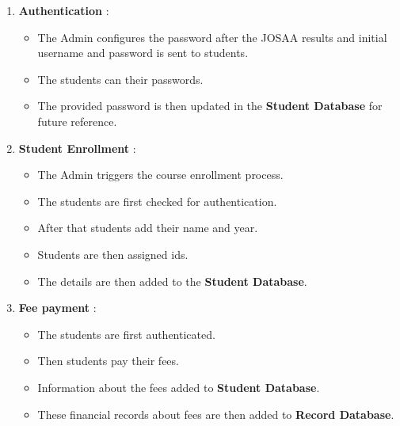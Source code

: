 \documentclass[12pt,a4paper]{article}
\begin{document}
\begin{enumerate}
	\item \textbf{Authentication} : 
		\begin{itemize}
			\item The Admin configures the password after the JOSAA results and initial username and password is sent to students.
			\item The students can their passwords.
			\item The provided password is then updated in the \textbf{Student Database} for future reference.
		\end{itemize}
	\item \textbf{Student Enrollment} :
		\begin{itemize}
			\item The Admin triggers the course enrollment process.
			\item The students are first checked for authentication.
			\item After that students add their name and year.
			\item Students are then assigned ids.
			\item The details are then added to the \textbf{Student Database}.
		\end{itemize}
	\item \textbf{Fee payment} :
		\begin{itemize}
			\item The students are first authenticated.
			\item Then students pay their fees.
			\item Information about the fees added to \textbf{Student Database}.
			\item These financial records about fees are then added to \textbf{Record Database}.
		\end{itemize}
	
\end{enumerate}
\end{document}
